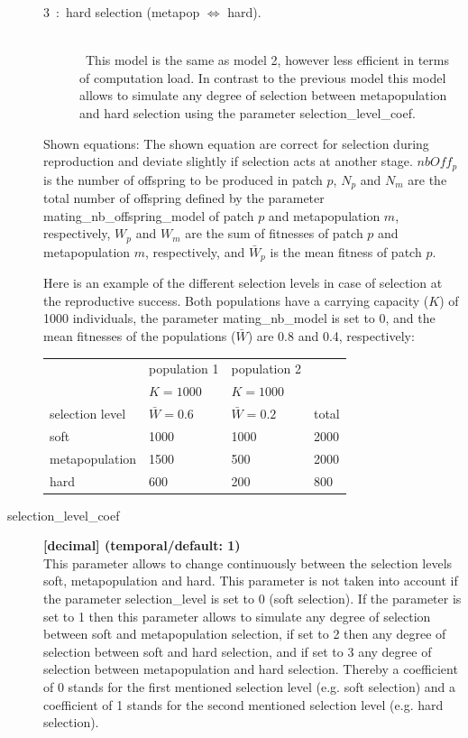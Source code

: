 \documentclass[letterpaper,12pt,oneside]{book}
\begin{document}
\begin{description}
\begin{description}
\item [3~:~hard selection (metapop $\Leftrightarrow$ hard).] \hspace*{\fill}\\\
This model is the same as model 2, however less efficient in terms of computation load. In contrast to the previous model this model allows to simulate any degree of selection between metapopulation and hard selection using the parameter \textsf{selection\_level\_coef}. 
\end{description}

Shown equations: The shown equation are correct for selection during reproduction and deviate slightly if selection acts at another stage. $nbOff_{p}$ is the number of offspring to be produced in patch $p$, $N_{p}$ and $N_{m}$ are the total number of offspring defined by the parameter \textsf{mating\_nb\_offspring\_model} of patch $p$ and metapopulation $m$, respectively, $W_{p}$ and $W_{m}$ are the sum of fitnesses of patch $p$ and metapopulation $m$, respectively, and $\bar{W}_{p}$ is the mean fitness of patch $p$. 


Here is an example of the different selection levels in case of selection at the reproductive success. Both populations have a carrying capacity ($K$) of 1000 individuals, the parameter \textsf{mating\_nb\_model} is set to 0, and the mean fitnesses of the populations ($\bar{W}$) are 0.8 and 0.4, respectively:\\
\begin{tabular*}{0.92\textwidth}{llll}
 \hline             & population 1    & population 2   & \\ 
                    & $K = 1000$      & $K = 1000$     & \\
 selection level&   $\bar{W} = 0.6$ & $\bar{W} = 0.2$& total\\
 \hline
 soft               & 1000            & 1000           & 2000\\
 metapopulation     & 1500            & 500            & 2000\\
 hard               & 600             & 200            & 800\\
 \hline
\end{tabular*}


\item[selection\_level\_coef\index{selection\_level\_coef}] \textbf{[decimal] (temporal/default: 1)}\\
This parameter allows to change continuously between the selection levels soft, metapopulation and hard. This parameter is not taken into account if the parameter \textsf{selection\_level} is set to 0 (soft selection). If the parameter is set to 1 then this parameter allows to simulate any degree of selection between soft and metapopulation selection, if set to 2 then any degree of selection between soft and hard selection, and if set to 3 any degree of selection between metapopulation and hard selection. Thereby a coefficient of 0 stands for the first mentioned selection level (e.g. soft selection) and a coefficient of 1 stands for the second mentioned selection level (e.g. hard selection).


\end{description}
\end{document}
